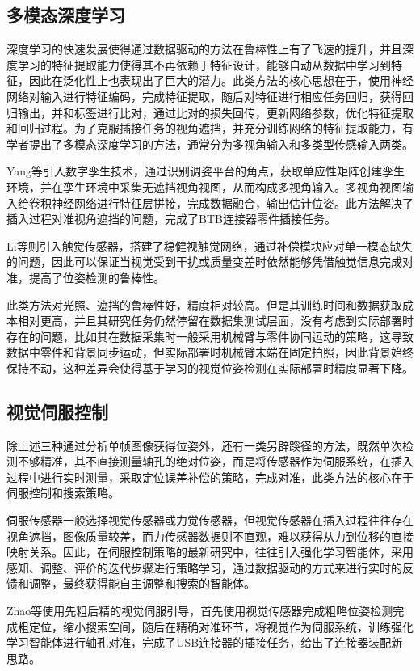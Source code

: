 \documentclass{Diploma}
\begin{document}
\subsection{多模态深度学习}
深度学习的快速发展使得通过数据驱动的方法在鲁棒性上有了飞速的提升，并且深度学习的特征提取能力使得其不再依赖于特征设计，能够自动从数据中学习到特征，因此在泛化性上也表现出了巨大的潜力。此类方法的核心思想在于，使用神经网络对输入进行特征编码，完成特征提取，随后对特征进行相应任务回归，获得回归输出，并和标签进行比对，通过比对的损失回传，更新网络参数，优化特征提取和回归过程。为了克服插接任务的视角遮挡，并充分训练网络的特征提取能力，有学者提出了多模态深度学习的方法，通常分为多视角输入和多类型传感输入两类。

Yang等引入数字孪生技术，通过识别调姿平台的角点，获取单应性矩阵创建孪生环境，并在孪生环境中采集无遮挡视角视图，从而构成多视角输入。多视角视图输入给卷积神经网络进行特征层拼接，完成数据融合，输出估计位姿。此方法解决了插入过程对准视角遮挡的问题，完成了BTB连接器零件插接任务\cite{yang2023digital}。
%

Li等则引入触觉传感器，搭建了稳健视触觉网络，通过补偿模块应对单一模态缺失的问题，因此可以保证当视觉受到干扰或质量变差时依然能够凭借触觉信息完成对准，提高了位姿检测的鲁棒性\cite{li2024v}。

此类方法对光照、遮挡的鲁棒性好，精度相对较高。但是其训练时间和数据获取成本相对更高，并且其研究任务仍然停留在数据集测试层面，没有考虑到实际部署时存在的问题，比如其在数据采集时一般采用机械臂与零件协同运动的策略，这导致数据中零件和背景同步运动，但实际部署时机械臂末端在固定拍照，因此背景始终保持不动，这种差异会使得基于学习的视觉位姿检测在实际部署时精度显著下降。
\subsection{视觉伺服控制}
除上述三种通过分析单帧图像获得位姿外，还有一类另辟蹊径的方法，既然单次检测不够精准，其不直接测量轴孔的绝对位姿，而是将传感器作为伺服系统，在插入过程中进行实时测量，采取定位误差补偿的策略，完成对准，此类方法的核心在于伺服控制和搜索策略。

伺服传感器一般选择视觉传感器或力觉传感器，但视觉传感器在插入过程往往存在视角遮挡，图像质量较差，而力传感器数据则不直观，难以获得从力到位移的直接映射关系。因此，在伺服控制策略的最新研究中，往往引入强化学习智能体，采用感知、调整、评价的迭代步骤进行策略学习，通过数据驱动的方式来进行实时的反馈和调整，最终获得能自主调整和搜索的智能体。

Zhao等使用先粗后精的视觉伺服引导，首先使用视觉传感器完成粗略位姿检测完成粗定位，缩小搜索空间，随后在精确对准环节，将视觉作为伺服系统，训练强化学习智能体进行轴孔对准，完成了USB连接器的插接任务，给出了连接器装配新思路\cite{zhao2023learning}。
%
\end{document}
